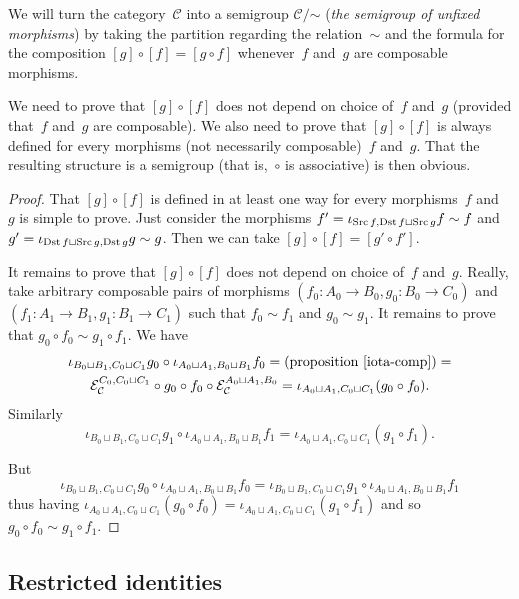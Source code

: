 \begin{defn}
We will turn the category~$\mathcal{C}$ into a semigroup
$\mathcal{C}/\mathord{\sim}$
(\emph{the semigroup of unfixed morphisms})
by taking the partition regarding the relation~$\sim$ and
the formula for the composition $[g]\circ[f] = [g\circ f]$ whenever~$f$ and~$g$
are composable morphisms.
\end{defn}

We need to prove that $[g]\circ[f]$ does not depend on
choice of~$f$ and~$g$ (provided that~$f$ and~$g$
are composable). We also need to prove that $[g]\circ[f]$
is always defined for every morphisms (not necessarily
composable)~$f$ and~$g$. That the resulting structure is
a semigroup (that is,~$\circ$ is associative) is then
obvious.

\begin{proof}
That $[g]\circ[f]$ is defined in at least one way for every
morphisms~$f$ and~$g$ is simple to prove. Just consider the
morphisms
$f'=\iota_{\operatorname{Src} f,\operatorname{Dst} f\sqcup\operatorname{Src} g}f\sim f$ and
$g'=\iota_{\operatorname{Dst} f\sqcup\operatorname{Src} g,\operatorname{Dst} g}g\sim g$.
Then we can take $[g]\circ[f]=[g'\circ f']$.

It remains to prove that $[g]\circ[f]$ does not depend on
choice of~$f$ and~$g$. Really, take arbitrary composable
pairs of morphisms $(f_0:A_0\to B_0,g_0:B_0\to C_0)$ and
$(f_1:A_1\to B_1,g_1:B_1\to C_1)$ such that
$f_0\sim f_1$ and $g_0\sim g_1$. It remains to prove that
$g_0\circ f_0\sim g_1\circ f_1$.
We have
\begin{multline*}
\iota_{B_0\sqcup B_1,C_0\sqcup C_1}g_0 \circ
\iota_{A_0\sqcup A_1,B_0\sqcup B_1}f_0
= \text{(proposition~\ref{iota-comp})} = \\
\mathcal{E}_{\mathcal{C}}^{C_0,C_0\sqcup C_1}\circ g_0 \circ
f_0\circ\mathcal{E}_{\mathcal{C}}^{A_0\sqcup A_1,B_0} =
\iota_{A_0\sqcup A_1,C_0\sqcup C_1}(g_0\circ f_0).
\end{multline*}
Similarly
\[\iota_{B_0\sqcup B_1,C_0\sqcup C_1}g_1 \circ
\iota_{A_0\sqcup A_1,B_0\sqcup B_1}f_1 =
\iota_{A_0\sqcup A_1,C_0\sqcup C_1}(g_1\circ f_1).\]

But
\[\iota_{B_0\sqcup B_1,C_0\sqcup C_1}g_0 \circ
\iota_{A_0\sqcup A_1,B_0\sqcup B_1}f_0 =
\iota_{B_0\sqcup B_1,C_0\sqcup C_1}g_1 \circ
\iota_{A_0\sqcup A_1,B_0\sqcup B_1}f_1\]
thus having
$\iota_{A_0\sqcup A_1,C_0\sqcup C_1}(g_0\circ f_0) =
\iota_{A_0\sqcup A_1,C_0\sqcup C_1}(g_1\circ f_1)$ and so
$g_0\circ f_0\sim g_1\circ f_1$.
\end{proof}

\subsection{Restricted identities}

